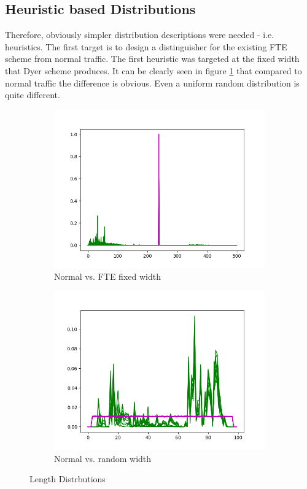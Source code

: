 \documentclass[10pt,a4paper]{article}
\begin{document}
\subsection{Heuristic based Distributions}

Therefore, obviously simpler distribution descriptions were needed - i.e. heuristics. The first target is to design a distinguisher for the existing FTE scheme from normal traffic. The first heuristic was targeted at the fixed width that Dyer scheme produces. It can be clearly seen in figure \ref{fig:fake_length_dist} that compared to normal traffic the difference is obvious. Even a uniform random distribution is quite different.

\begin{figure}[h]
\begin{subfigure}[b]{.49\linewidth}
\includegraphics[width=\linewidth]{fake_length_dist}
\caption{Normal vs. FTE fixed width}
\label{fig:fake_length_dist}
\end{subfigure}
\begin{subfigure}[b]{.49\linewidth}
\includegraphics[width=\linewidth]{uniform_length_dist}
\caption{Normal vs. random width}
\label{fig:uniform_length_dist}
\end{subfigure}
\caption{Length Distrbutions}
\end{figure}
\end{document}
